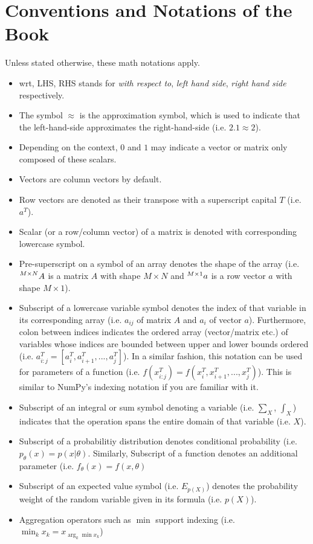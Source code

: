 \documentclass{book}
\numberwithin{equation}{subsection}
\begin{document}
\section{Conventions and Notations of the Book}
Unless stated otherwise, these math notations apply.
\begin{itemize}
    \item wrt, LHS, RHS stands for \textit{with respect to}, \textit{left hand side}, \textit{right hand side} respectively.
    \item The symbol $\approx$ is the approximation symbol, which is used to indicate that the left-hand-side approximates the right-hand-side (i.e. $2.1 \approx 2$).
    \item Depending on the context, $0$ and $1$ may indicate a vector or matrix only composed of these scalars.
    \item Vectors are column vectors by default.
    \item Row vectors are denoted as their transpose with a superscript capital $T$ (i.e. $a^T$).
    \item Scalar (or a row/column vector) of a matrix is denoted with corresponding lowercase symbol.
    \item Pre-superscript on a symbol of an array denotes the shape of the array (i.e. $\prescript{M\times N}{}{A}$ is a matrix $A$ with shape $M\times N$ and $\prescript{M\times 1}{}{a}$ is a row vector $a$ with shape $M\times 1$).
    \item Subscript of a lowercase variable symbol denotes the index of that variable in its corresponding array (i.e. $a_{ij}$ of matrix $A$ and $a_i$ of vector $a$). Furthermore, colon between indices indicates the ordered array (vector/matrix etc.) of variables whose indices are bounded between upper and lower bounds ordered (i.e. $a^T_{i:j} = [a^T_i, a^T_{i+1}, ..., a^T_j]$). In a similar fashion, this notation can be used for parameters of a function (i.e. $f(x^T_{i:j}) = f(x^T_i, x^T_{i+1}, ..., x^T_j)$). This is similar to NumPy's indexing notation if you are familiar with it.
    \item Subscript of an integral or sum symbol denoting a variable (i.e. $\sum_X$, $\int_X$) indicates that the operation spans the entire domain of that variable (i.e. $X$).
    \item Subscript of a probabilitiy distribution denotes conditional probability (i.e. $p_\theta(x) = p(x|\theta)$. Similarly, Subscript of a function denotes an additional parameter (i.e. $f_\theta(x) = f(x, \theta)$
    \item Subscript of an expected value symbol (i.e. $E_{p(X)}$) denotes the probability weight of the random variable given in its formula (i.e. $p(X)$).
    \item Aggregation operators such as $\min$ support indexing (i.e. $\min_kx_k = x_{\arg_k\min x_k}$)
\end{itemize}
\end{document}
